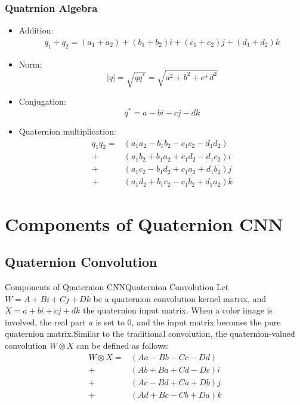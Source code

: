 \documentclass{beamer}
\begin{document}
\begin{frame}
    \frametitle{Quatrnion Algebra}
    \begin{itemize}
        \item Addition:
        \begin{equation*}
            \begin{split}
                q_1+q_2=(a_1+a_2)+(b_1+b_2)i+(c_1+c_2)j+(d_1+d_2)k
            \end{split}
        \end{equation*}
        \item Norm: $$|q|=\sqrt{qq^*}=\sqrt{a^2+b^2+c^+d^2}$$
        \item Conjugation: $$q^*=a-bi-cj-dk$$
        \item Quaternion multiplication: 
        \begin{equation*}
            \begin{split}
                q_1q_2=&(a_1a_2-b_1b_2-c_1c_2-d_1d_2)\\
                            +&(a_1b_2+b_1a_2+c_1d_2-d_1c_2)i\\
                            +&(a_1c_2-b_1d_2+c_1a_2+d_1b_2)j\\
                            +&(a_1d_2+b_1c_2-c_1b_2+d_1a_2)k
            \end{split}
        \end{equation*}
    \end{itemize}
\end{frame}
\section{Components of Quaternion CNN}
\subsection{Quaternion Convolution}
\begin{frame}{Components of Quaternion CNN}{Quaternion Convolution}
Let $W=A+Bi+Cj+Dk$ be a quaternion convolution kernel matrix, and $X=a+bi+cj+dk$ the quaternion input matrix. When a color image is involved, the real part $a$ is set to $0$, and the input matrix becomes the pure quaternion matrix.Similar to the traditional convolution, the quaternion-valued convolution $W\otimes X$ can be defined as follows:
\begin{equation}
    \begin{split}
        W\otimes X=&(Aa-Bb-Cc-Dd)\\
                    +&(Ab+Ba+Cd-Dc)i\\
                    +&(Ac-Bd+Ca+Db)j\\
                    +&(Ad+Bc-Cb+Da)k
    \end{split}
\end{equation}
\end{frame}
\end{document}
